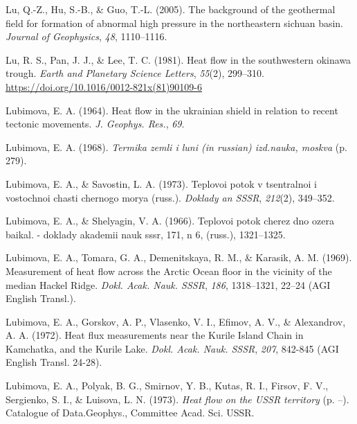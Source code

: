 \begin{CSLReferences}{1}{1}
\leavevmode{}%
Lu, Q.-Z., Hu, S.-B., \& Guo, T.-L. (2005). The background of the geothermal field for formation of abnormal high pressure in the northeastern sichuan basin. \emph{Journal of Geophysics}, \emph{48}, 1110--1116.

\leavevmode{}%
Lu, R. S., Pan, J. J., \& Lee, T. C. (1981). Heat flow in the southwestern okinawa trough. \emph{Earth and Planetary Science Letters}, \emph{55}(2), 299--310. \url{https://doi.org/10.1016/0012-821x(81)90109-6}

\leavevmode{}%
Lubimova, E. A. (1964). Heat flow in the ukrainian shield in relation to recent tectonic movements. \emph{J. Geophys. Res.}, \emph{69}.

\leavevmode{}%
Lubimova, E. A. (1968). \emph{Termika zemli i luni (in russian) izd.nauka, moskva} (p. 279).

\leavevmode{}%
Lubimova, E. A., \& Savostin, L. A. (1973). Teplovoi potok v tsentralnoi i vostochnoi chasti chernogo morya (russ.). \emph{Doklady an SSSR}, \emph{212}(2), 349--352.

\leavevmode{}%
Lubimova, E. A., \& Shelyagin, V. A. (1966). Teplovoi potok cherez dno ozera baikal. - doklady akademii nauk sssr, 171, n 6, (russ.), 1321--1325.

\leavevmode{}%
Lubimova, E. A., Tomara, G. A., Demenitskaya, R. M., \& Karasik, A. M. (1969). Measurement of heat flow across the {Arctic Ocean} floor in the vicinity of the median {Hackel Ridge}. \emph{Dokl. Acak. Nauk. SSSR}, \emph{186}, 1318--1321, 22--24 (AGI English Transl.).

\leavevmode{}%
Lubimova, E. A., Gorskov, A. P., Vlasenko, V. I., Efimov, A. V., \& Alexandrov, A. A. (1972). Heat flux measurements near the {Kurile Island Chain} in {Kamchatka}, and the {Kurile Lake}. \emph{Dokl. Acak. Nauk. SSSR}, \emph{207}, 842-845 (AGI English Transl. 24-28).

\leavevmode{}%
Lubimova, E. A., Polyak, B. G., Smirnov, Y. B., Kutas, R. I., Firsov, F. V., Sergienko, S. I., \& Luisova, L. N. (1973). \emph{Heat flow on the USSR territory} (p. --). Catalogue of Data.Geophys., Committee Acad. Sci. USSR.


\end{CSLReferences}

